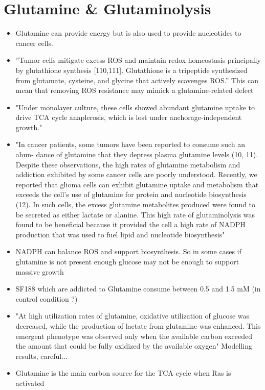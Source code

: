 \documentclass[11pt,a4paper]{article}
\begin{document}
\section{Glutamine \& Glutaminolysis}
\begin{itemize}
\item Glutamine can provide energy but is also used to provide nucleotides to cancer cells. \cite{Natarajan2019}\cite{Ma2022}
\item ”Tumor cells mitigate excess ROS and maintain redox homeostasis principally by
glutathione synthesis [110,111]. Glutathione is a tripeptide synthesized from glutamate,
cysteine, and glycine that actively scavenges ROS.”\cite{Natarajan2019} This can mean that removing ROS resistance may mimick a glutamine-related defect
\item "Under monolayer culture, these cells showed abundant glutamine uptake to drive TCA cycle anaplerosis, which is lost under anchorage-independent growth." \cite{Natarajan2019}
\item "In cancer patients, some tumors have been reported to consume such an abun-
dance of glutamine that they depress plasma glutamine levels (10, 11). Despite these
observations, the high rates of glutamine metabolism and addiction exhibited by some
cancer cells are poorly understood. Recently, we reported that glioma cells can exhibit
glutamine uptake and metabolism that exceeds the cell’s use of glutamine for protein and
nucleotide biosynthesis (12). In such cells, the excess glutamine metabolites produced
were found to be secreted as either lactate or alanine. This high rate of glutaminolysis
was found to be beneficial because it provided the cell a high rate of NADPH production
that was used to fuel lipid and nucleotide biosynthesis" \cite{Wise2008} 
\item NADPH can balance ROS and support biosynthesis. So in some cases if glutamine is not present enough glucose may not be enough to support massive growth
\item SF188 which are addicted to Glutamine consume between 0.5 and 1.5 mM (in control condition ?) \cite{Wise2008}
\item "At high utilization rates of glutamine, oxidative utilization of glucose was decreased, while the production of lactate from glutamine was enhanced. This emergent phenotype was observed only when the available carbon exceeded the amount that could be fully oxidized by the available oxygen" Modelling results, careful...\cite{Damiani2017}
\item Glutamine is the main carbon source for the TCA cycle when Ras is activated \cite{Ma2022}

\end{itemize}
\end{document}

